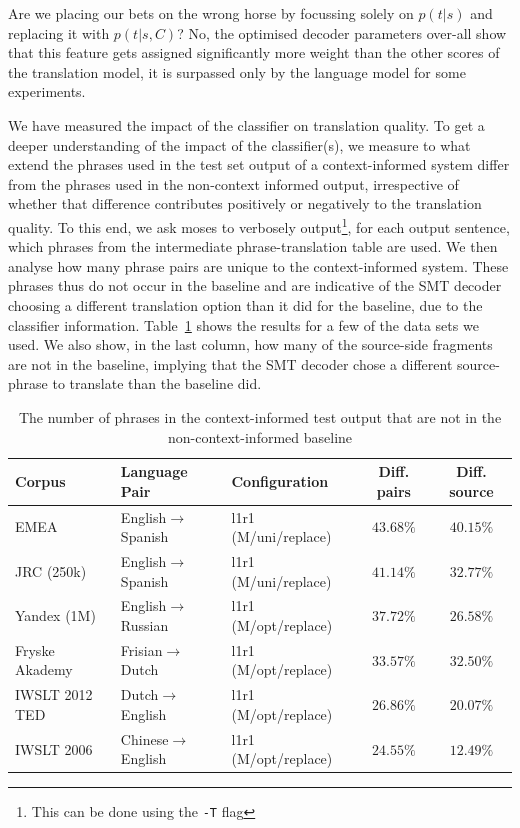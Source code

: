 \documentclass[smallextended]{svjour3}       %
\theoremstyle{break}
\begin{document}
Are we placing our bets on the wrong horse by focussing solely on $p(t|s)$ and
replacing it with $p(t|s,C)$? No, the optimised decoder parameters over-all
show that this feature gets assigned significantly more weight than the other
scores of the translation model, it is surpassed only by the language model for
some experiments.

We have measured the impact of the classifier on translation quality. To get a
deeper understanding of the impact of the classifier(s), we measure to what
extend the phrases used in the test set output of a context-informed system
differ from the phrases used in the non-context informed output, irrespective
of whether that difference contributes positively or negatively to the
translation quality. To this end, we ask moses to verbosely
output\footnote{This can be done using the \texttt{-T} flag}, for each output
sentence, which phrases from the intermediate phrase-translation table are
used. We then analyse how many phrase pairs are unique to the context-informed
system. These phrases thus do not occur in the baseline and are indicative of
the SMT decoder choosing a different translation option than it did for the
baseline, due to the classifier information. Table~\ref{tab:decodediff} shows
the results for a few of the data sets we used. We also show, in the last
column, how many of the source-side fragments are not in the baseline, implying
that the SMT decoder chose a different source-phrase to translate than the
baseline did.

\begin{table}
\begin{tabular}{|lll|cc|}
\hline
\textbf{Corpus} & \textbf{Language Pair} & \textbf{Configuration} &
\textbf{Diff. pairs} & \textbf{Diff. source} \\
\hline
EMEA & English$\rightarrow$Spanish & l1r1 (M/uni/replace) & $43.68\%$ & $40.15\%$ \\
JRC (250k) & English$\rightarrow$Spanish & l1r1 (M/uni/replace) & $41.14\%$ & $32.77\%$ \\
Yandex (1M) & English$\rightarrow$Russian & l1r1 (M/opt/replace) & $37.72\%$ & $26.58\%$ \\
Fryske Akademy & Frisian$\rightarrow$Dutch & l1r1 (M/opt/replace) & $33.57\%$ & $32.50\%$ \\
IWSLT 2012 TED & Dutch$\rightarrow$English & l1r1 (M/opt/replace) & $26.86\%$ & $20.07\%$ \\
IWSLT 2006 & Chinese$\rightarrow$English & l1r1 (M/opt/replace) & $24.55\%$ & $12.49\%$ \\
\hline
\end{tabular}
\caption{The number of phrases in the context-informed test output that are not
in the non-context-informed baseline}
\label{tab:decodediff}
\end{table}
\end{document}
